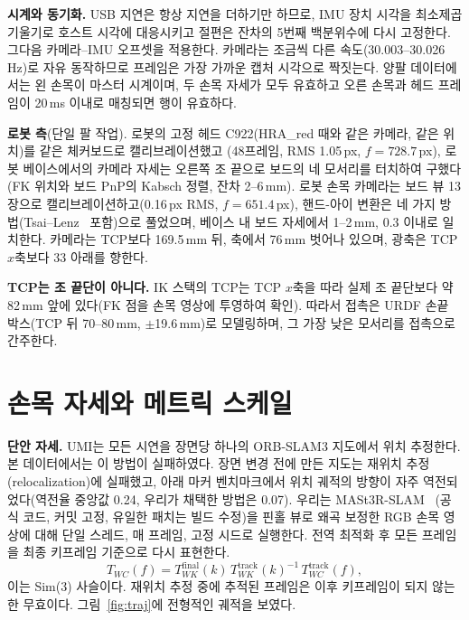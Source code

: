 \documentclass[conference,10pt]{IEEEtran}
\newcommand{\mm}{\,mm\xspace}
\begin{document}
\textbf{시계와 동기화.} USB 지연은 항상 지연을 더하기만 하므로, IMU 장치 시각을 최소제곱 기울기로 호스트 시각에 대응시키고 절편은
잔차의 5번째 백분위수에 다시 고정한다. 그다음 카메라--IMU 오프셋을 적용한다. 카메라는 조금씩 다른 속도(30.003--30.026\,Hz)로 자유
동작하므로 프레임은 가장 가까운 캡처 시각으로 짝짓는다. 양팔 데이터에서는 왼 손목이 마스터 시계이며, 두 손목 자세가 모두 유효하고
오른 손목과 헤드 프레임이 20\,ms 이내로 매칭되면 행이 유효하다.

\textbf{로봇 측}(단일 팔 작업). 로봇의 고정 헤드 C922(HRA\_red 때와 같은 카메라, 같은 위치)를 같은 체커보드로 캘리브레이션했고
(48프레임, RMS 1.05\,px, $f=728.7$\,px), 로봇 베이스에서의 카메라 자세는 오른쪽 조 끝으로 보드의 네 모서리를 터치하여 구했다(FK
위치와 보드 PnP의 Kabsch 정렬, 잔차 2--6\mm). 로봇 손목 카메라는 보드 뷰 13장으로 캘리브레이션하고(0.16\,px RMS, $f=651.4$\,px),
핸드-아이 변환은 네 가지 방법(Tsai--Lenz~\cite{tsai1989handeye} 포함)으로 풀었으며, 베이스 내 보드 자세에서 1--2\mm,
0.3\textdegree{} 이내로 일치한다. 카메라는 TCP보다 169.5\mm{} 뒤, 축에서 76\mm{} 벗어나 있으며, 광축은 TCP $x$축보다
33\textdegree{} 아래를 향한다.

\textbf{TCP는 조 끝단이 아니다.} IK 스택의 TCP는 TCP $x$축을 따라 실제 조 끝단보다 약 82\mm{} 앞에 있다(FK 점을 손목 영상에 투영하여
확인). 따라서 접촉은 URDF 손끝 박스(TCP 뒤 70--80\mm, $\pm$19.6\mm)로 모델링하며, 그 가장 낮은 모서리를 접촉으로 간주한다.

\section{손목 자세와 메트릭 스케일}\label{sec:pose}
\textbf{단안 자세.} UMI는 모든 시연을 장면당 하나의 ORB-SLAM3 지도에서 위치 추정한다. 본 데이터에서는 이 방법이 실패하였다. 장면
변경 전에 만든 지도는 재위치 추정(relocalization)에 실패했고, 아래 마커 벤치마크에서 위치 궤적의 방향이 자주 역전되었다(역전율 중앙값 0.24, 우리가 채택한 방법은 0.07). 우리는 MASt3R-SLAM~\cite{murai2025mast3rslam}
(공식 코드, 커밋 고정, 유일한 패치는 빌드 수정)을 핀홀 뷰로 왜곡 보정한 RGB 손목 영상에 대해 단일 스레드, 매 프레임, 고정 시드로
실행한다. 전역 최적화 후 모든 프레임을 최종 키프레임 기준으로 다시 표현한다.
\begin{equation}
T_{WC}(f) = T_{WK}^{\text{final}}(k)\,T_{WK}^{\text{track}}(k)^{-1}\,T_{WC}^{\text{track}}(f),
\end{equation}
이는 Sim(3) 사슬이다. 재위치 추정 중에 추적된 프레임은 이후 키프레임이 되지 않는 한 무효이다. 그림~\ref{fig:traj}에 전형적인 궤적을
보였다.
\end{document}
